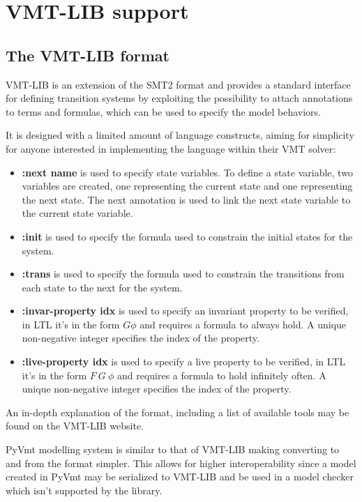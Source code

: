 \chapter{VMT-LIB support}

\section{The VMT-LIB format}
VMT-LIB is an extension of the SMT2 format and provides a standard interface for defining transition systems by exploiting the possibility to attach annotations to terms and formulas, which can be used to specify the model behaviors. \cite{vmt-lib-paper}

It is designed with a limited amount of language constructs, aiming for simplicity for anyone interested in implementing the language within their VMT solver:
\begin{itemize}
    \item \textbf{:next name} is used to specify state variables. To define a state variable, two variables are created, one representing the current state and one representing the next state. The next annotation is used to link the next state variable to the current state variable.
    \item \textbf{:init} is used to specify the formula used to constrain the initial states for the system.
    \item \textbf{:trans} is used to specify the formula used to constrain the transitions from each state to the next for the system.
    \item \textbf{:invar-property idx} is used to specify an invariant property to be verified, in LTL it's in the form \begin{math} G \phi \end{math} and requires a formula to always hold.  A unique non-negative integer specifies the index of the property.
    \item \textbf{:live-property idx} is used to specify a live property to be verified, in LTL it's in the form \begin{math} F\ G\ \phi\end{math} and requires a formula to hold infinitely often. A unique non-negative integer specifies the index of the property.
\end{itemize}

An in-depth explanation of the format, including a list of available tools may be found on the VMT-LIB website. \cite{VMT-LIB}

PyVmt modelling system is similar to that of VMT-LIB making converting to and from the format simpler.
This allows for higher interoperability since a model created in PyVmt may be serialized to VMT-LIB and be used in a model checker which isn't supported by the library.

